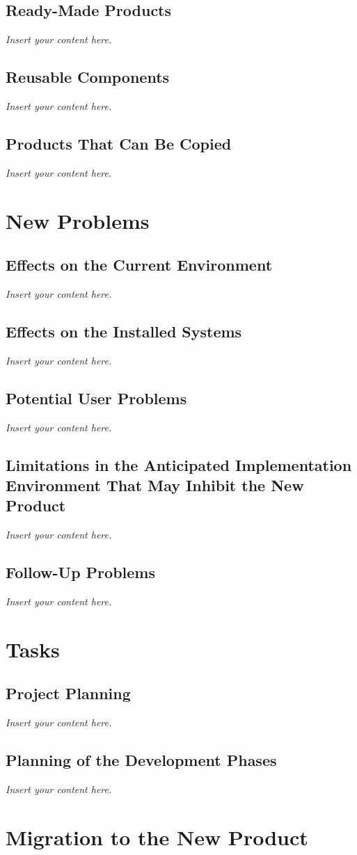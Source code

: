 \documentclass[12pt]{article}
\newcommand{\lips}{\textit{Insert your content here.}}
\begin{document}
\subsection{Ready-Made Products}
\lips
\subsection{Reusable Components}
\lips
\subsection{Products That Can Be Copied}
\lips

\section{New Problems}
\subsection{Effects on the Current Environment}
\lips
\subsection{Effects on the Installed Systems}
\lips
\subsection{Potential User Problems}
\lips
\subsection{Limitations in the Anticipated Implementation Environment That May
Inhibit the New Product}
\lips
\subsection{Follow-Up Problems}
\lips

\section{Tasks}
\subsection{Project Planning}
\lips
\subsection{Planning of the Development Phases}
\lips

\section{Migration to the New Product}
\end{document}
